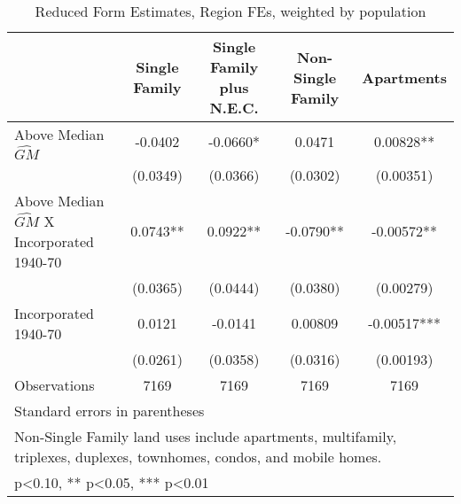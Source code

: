 \begin{table}[htbp]\centering
\def\sym#1{\ifmmode^{#1}\else\(^{#1}\)\fi}
\caption{Reduced Form Estimates, Region FEs, weighted by population}
\begin{tabular}{l*{4}{c}}
\toprule
                    &\multicolumn{1}{c}{Single Family}&\multicolumn{1}{c}{Single Family plus N.E.C.}&\multicolumn{1}{c}{Non-Single Family}&\multicolumn{1}{c}{Apartments}\\
\midrule
Above Median $\widehat{GM}$&     -0.0402   &     -0.0660*  &      0.0471   &     0.00828** \\
                    &    (0.0349)   &    (0.0366)   &    (0.0302)   &   (0.00351)   \\
\addlinespace
Above Median $\widehat{GM}$ X Incorporated 1940-70&      0.0743** &      0.0922** &     -0.0790** &    -0.00572** \\
                    &    (0.0365)   &    (0.0444)   &    (0.0380)   &   (0.00279)   \\
\addlinespace
Incorporated 1940-70&      0.0121   &     -0.0141   &     0.00809   &    -0.00517***\\
                    &    (0.0261)   &    (0.0358)   &    (0.0316)   &   (0.00193)   \\
\midrule
Observations        &        7169   &        7169   &        7169   &        7169   \\
\bottomrule
\multicolumn{5}{l}{\footnotesize Standard errors in parentheses}\\
\multicolumn{5}{l}{\footnotesize Non-Single Family land uses include apartments, multifamily, triplexes, duplexes, townhomes, condos, and mobile homes.}\\
\multicolumn{5}{l}{\footnotesize * p<0.10, ** p<0.05, *** p<0.01}\\
\end{tabular}
\end{table}
